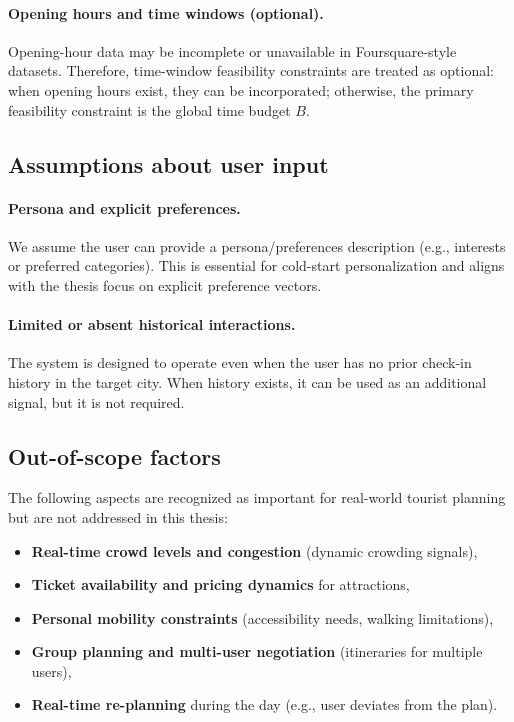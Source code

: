 \paragraph{Opening hours and time windows (optional).}
Opening-hour data may be incomplete or unavailable in Foursquare-style datasets. Therefore, time-window feasibility constraints are treated as optional: when opening hours exist, they can be incorporated; otherwise, the primary feasibility constraint is the global time budget $B$.

\subsection{Assumptions about user input}
\paragraph{Persona and explicit preferences.}
We assume the user can provide a persona/preferences description (e.g., interests or preferred categories). This is essential for cold-start personalization and aligns with the thesis focus on explicit preference vectors.

\paragraph{Limited or absent historical interactions.}
The system is designed to operate even when the user has no prior check-in history in the target city. When history exists, it can be used as an additional signal, but it is not required.

\subsection{Out-of-scope factors}
The following aspects are recognized as important for real-world tourist planning but are not addressed in this thesis:
\begin{itemize}[leftmargin=*]
    \item \textbf{Real-time crowd levels and congestion} (dynamic crowding signals),
    \item \textbf{Ticket availability and pricing dynamics} for attractions,
    \item \textbf{Personal mobility constraints} (accessibility needs, walking limitations),
    \item \textbf{Group planning and multi-user negotiation} (itineraries for multiple users),
    \item \textbf{Real-time re-planning} during the day (e.g., user deviates from the plan).
\end{itemize}

